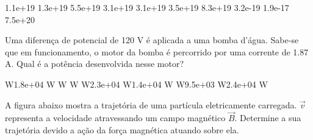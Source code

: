 \documentclass[12pt, addpoints]{exam}
\begin{document}
\begin{questions}
\begin{multicols*}{2}
\begin{oneparchoices}
\choice 1.1e+19 \choice 1.3e+19 \choice 5.5e+19 \choice 3.1e+19 \choice 3.1e+19 \choice 3.5e+19 \choice 8.3e+19 \choice 3.2e-19 \choice 1.9e-17 \choice 7.5e+20 
\end{oneparchoices}\question Uma diferença de potencial de 120 V é aplicada a uma bomba d’água. Sabe-se que em funcionamento, o motor da bomba é percorrido por uma corrente de    1.87 A. Qual é a potência desenvolvida nesse motor?

\begin{oneparchoices}
 W\choice 1.8e+04 W W W W\choice 2.3e+04 W\choice 1.4e+04 W W\choice 9.5e+03 W\choice 2.4e+04 W
\end{oneparchoices}\question A ﬁgura abaixo mostra a trajetória de uma partícula eletricamente carregada. $\vec{{v}}$ representa a velocidade atravessando um campo magnético $\vec{{B}}$. Determine a sua trajetória devido a ação da força magnética atuando sobre ela.
        
        \begin{center}
            \begin{minipage}[c]{0.5\linewidth}
            \end{minipage}
        \end{center}

        


\end{multicols*}
\end{questions}
\end{document}
